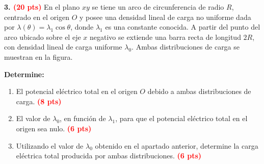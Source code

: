\documentclass[12pt]{article}
\begin{document}
\noindent
\textbf{3. \textcolor{red}{(20 pts)}} 
En el plano $xy$ se tiene un arco de circunferencia de radio $R$, centrado en el origen $O$ y posee una densidad lineal de carga no uniforme dada por $\lambda(\theta)=\lambda_1\cos\theta$, donde $\lambda_1$ es una constante conocida. A partir del punto del arco ubicado sobre el eje $x$ negativo se extiende una barra recta de longitud $2R$, con densidad lineal 
de carga uniforme $\lambda_0$. Ambas distribuciones de carga se muestran en la figura.

\vspace{0.25cm}

\noindent
\begin{minipage}[t]{0.58\textwidth}
\vspace{0pt}

\textbf{Determine:}

\vspace{0.25cm}

\begin{enumerate}[
    label=\alph*),
    leftmargin=0.55cm,
    labelsep=0.15cm,
    itemsep=0.55cm,
    topsep=0pt
]

    \item El potencial eléctrico total en el origen $O$ debido a 
    ambas distribuciones de carga. 
    \textcolor{red}{\textbf{(8 pts)}}

    \item El valor de $\lambda_0$, en función de $\lambda_1$, para 
    que el potencial eléctrico total en el origen sea nulo. 
    \textcolor{red}{\textbf{(6 pts)}}

    \item Utilizando el valor de $\lambda_0$ obtenido en el apartado 
    anterior, determine la carga eléctrica total producida por ambas distribuciones. 
    \textcolor{red}{\textbf{(6 pts)}}

\end{enumerate}

\end{minipage}
\hfill
%
\end{document}
